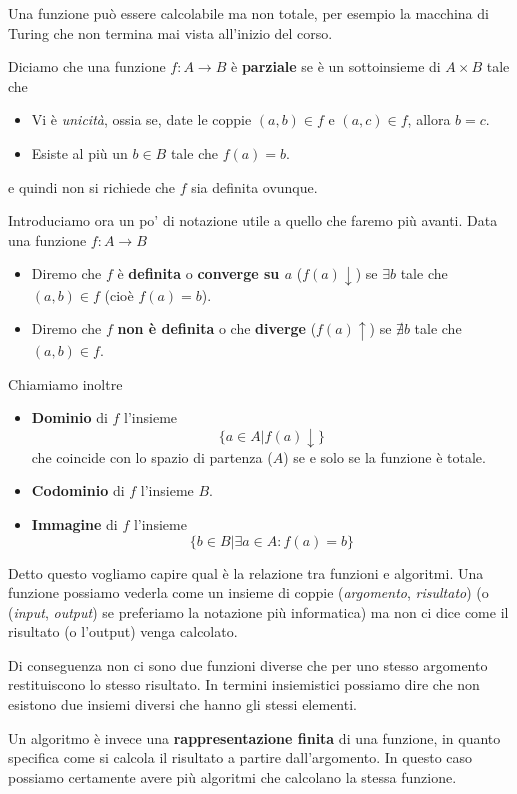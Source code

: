 Una funzione può essere calcolabile ma non totale, per esempio
la macchina di Turing che non termina mai vista all'inizio del
corso.

\begin{definition}
	Diciamo che una funzione $f : A \to B$ è \textbf{parziale}
	se è un sottoinsieme di $A \times B$ tale che
	\begin{itemize}
		\item Vi è \emph{unicità}, ossia se, date le coppie
		      $(a, b) \in f$ e $(a, c) \in f$, allora $b=c$.
		\item Esiste al più un $b \in B$ tale che $f(a) = b$.
	\end{itemize}
	e quindi non si richiede che $f$ sia definita ovunque.
\end{definition}

Introduciamo ora un po' di notazione utile a quello che faremo
più avanti. Data una funzione $f : A \to B$
\begin{itemize}
	\item Diremo che $f$ è \textbf{definita} o
	      \textbf{converge su $a$} ($f(a) \downarrow$) se
	      $\exists b$ tale che $(a, b) \in f$ (cioè
	      $f(a) = b$).
	\item Diremo che $f$ \textbf{non è definita} o che
	      \textbf{diverge} ($f(a) \uparrow$) se $\nexists b$
	      tale che $(a, b) \in f$.
\end{itemize}
Chiamiamo inoltre
\begin{itemize}
	\item \textbf{Dominio} di $f$ l'insieme
	      \[ \{ a \in A | f(a) \downarrow \} \]
	      che coincide con lo spazio di partenza ($A$) se e
	      solo se la funzione è totale.
	\item \textbf{Codominio} di $f$ l'insieme $B$.
	\item \textbf{Immagine} di $f$ l'insieme
	      \[ \{ b \in B | \exists a \in A : f(a) = b \} \]
\end{itemize}

Detto questo vogliamo capire qual è la relazione tra funzioni
e algoritmi. Una funzione possiamo vederla come un insieme di
coppie (\emph{argomento}, \emph{risultato}) (o (\emph{input},
\emph{output}) se preferiamo la notazione più informatica) ma
non ci dice come il risultato (o l'output) venga calcolato.

Di conseguenza non ci sono due funzioni diverse che per uno
stesso argomento restituiscono lo stesso risultato. In termini
insiemistici possiamo dire che non esistono due insiemi diversi
che hanno gli stessi elementi.
\begin{tcolorbox}
	Un algoritmo è invece una \textbf{rappresentazione finita}
	di una funzione, in quanto specifica come si calcola il
	risultato a partire dall'argomento. In questo caso possiamo
	certamente avere più algoritmi che calcolano la stessa
	funzione.
\end{tcolorbox}

